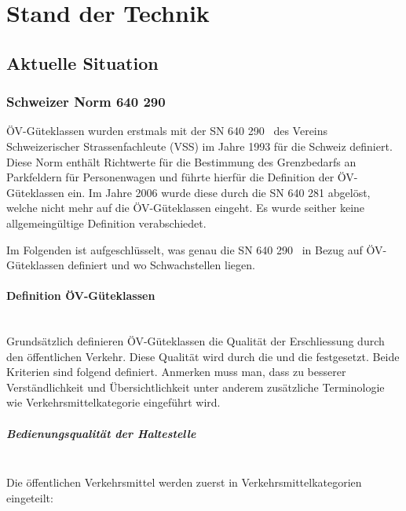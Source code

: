 
\section{Stand der Technik}
\label{Stand der Technik}

\subsection{Aktuelle Situation}
\label{Stand der Technik:Aktuelle Situation}

\subsubsection{Schweizer Norm 640 290}
\label{Aktuelle Situation:Schweizer Norm 640 290}

\acs{ÖV}-Güteklassen wurden erstmals mit der \ac{SN} 640 290~\cite{sn640290} des Vereins Schweizerischer Strassenfachleute (VSS) im Jahre 1993 für die Schweiz definiert.
Diese Norm enthält Richtwerte für die Bestimmung des Grenzbedarfs an Parkfeldern für Personenwagen und führte hierfür die Definition der \acs{ÖV}-Güteklassen ein.
Im Jahre 2006 wurde diese durch die \acs{SN} 640 281 abgelöst, welche nicht mehr auf die \acs{ÖV}-Güteklassen eingeht.
Es wurde seither keine allgemeingültige Definition verabschiedet.

Im Folgenden ist aufgeschlüsselt, was genau die \acs{SN} 640 290~\cite{sn640290} in Bezug auf \acs{ÖV}-Güteklassen definiert und wo Schwachstellen liegen.

\paragraph{Definition ÖV-Güteklassen}~\\
\label{Schweizer Norm 640 290:Definition ÖV-Güteklassen}
Grundsätzlich definieren \acs{ÖV}-Güteklassen die Qualität der Erschliessung durch den öffentlichen Verkehr.
Diese Qualität wird durch die  und die  festgesetzt.
Beide Kriterien sind folgend definiert.
Anmerken muss man, dass zu besserer Verständlichkeit und Übersichtlichkeit unter anderem zusätzliche Terminologie wie Verkehrsmittelkategorie eingeführt wird.

\subparagraph{Bedienungsqualität der Haltestelle}~\\
\label{Definition ÖV-Güteklassen:Bedienungsqualität der Haltestelle}
Die öffentlichen Verkehrsmittel werden zuerst in Verkehrsmittelkategorien eingeteilt:

